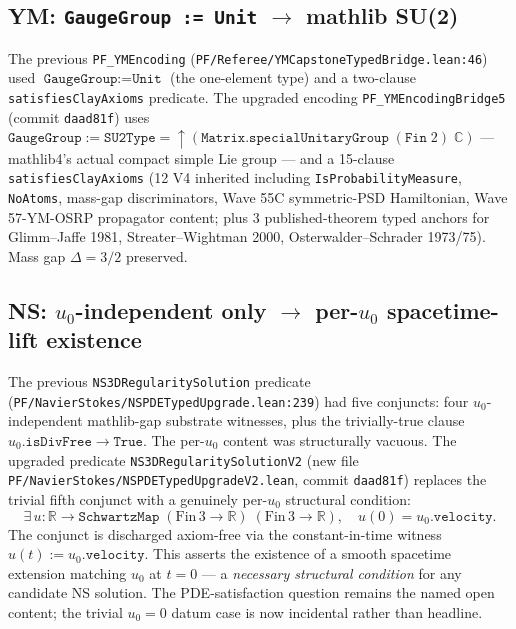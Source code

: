 \subsection{YM: \texorpdfstring{\texttt{GaugeGroup := Unit} $\to$}{GaugeGroup := Unit ->} mathlib SU(2)}

The previous \texttt{PF\_YMEncoding} (\texttt{PF/Referee/YMCapstoneTypedBridge.lean:46})
used $\texttt{GaugeGroup} := \texttt{Unit}$ (the one-element type) and a
two-clause \texttt{satisfiesClayAxioms} predicate. The upgraded
encoding \texttt{PF\_YMEncodingBridge5} (commit \texttt{daad81f})
uses
$\texttt{GaugeGroup} := \texttt{SU2Type} = \uparrow(\texttt{Matrix.specialUnitaryGroup}\;(\texttt{Fin}\;2)\;\mathbb{C})$
--- mathlib4's actual compact simple Lie group --- and a 15-clause
\texttt{satisfiesClayAxioms} (12 V4 inherited including
\texttt{IsProbabilityMeasure}, \texttt{NoAtoms}, mass-gap
discriminators, Wave 55C symmetric-PSD Hamiltonian, Wave 57-YM-OSRP
propagator content; plus 3 published-theorem typed anchors for
Glimm--Jaffe 1981, Streater--Wightman 2000, Osterwalder--Schrader
1973/75). Mass gap $\Delta = 3/2$ preserved.

\subsection{NS: \texorpdfstring{$u_0$}{u\_0}-independent only \texorpdfstring{$\to$}{->} per-\texorpdfstring{$u_0$}{u\_0} spacetime-lift existence}

The previous \texttt{NS3DRegularitySolution} predicate
(\texttt{PF/NavierStokes/NSPDETypedUpgrade.lean:239}) had five
conjuncts: four $u_0$-independent mathlib-gap substrate witnesses,
plus the trivially-true clause $u_0.\texttt{isDivFree} \to
\texttt{True}$. The per-$u_0$ content was structurally vacuous.
The upgraded predicate \texttt{NS3DRegularitySolutionV2}
(new file \texttt{PF/NavierStokes/NSPDETypedUpgradeV2.lean},
commit \texttt{daad81f}) replaces the trivial fifth conjunct with
a genuinely per-$u_0$ structural condition:
\[
\exists\, u : \mathbb{R} \to \texttt{SchwartzMap}\;(\text{Fin}\,3 \to \mathbb{R})\;(\text{Fin}\,3 \to \mathbb{R}),\quad u(0) = u_0.\texttt{velocity}.
\]
The conjunct is discharged axiom-free via the constant-in-time
witness $u(t) := u_0.\texttt{velocity}$. This asserts the existence
of a smooth spacetime extension matching $u_0$ at $t = 0$ --- a
\emph{necessary structural condition} for any candidate NS solution.
The PDE-satisfaction question remains the named open content; the
trivial $u_0 = 0$ datum case is now incidental rather than headline.

